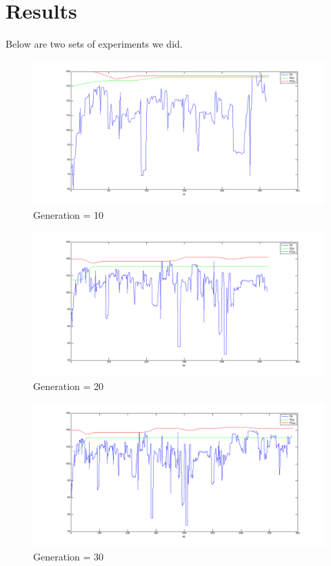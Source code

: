 \documentclass{article} %
\begin{document}
\section{Results}
Below are two sets of experiments we did.
\begin{figure}[H]
\centering
\includegraphics[scale=0.3]{images/FTGA/exp1/10.png}
\caption{Generation = 10}
\end{figure}
\begin{figure}[H]
\centering
\includegraphics[scale=0.3]{images/FTGA/exp1/20.png}
\caption{Generation = 20}
\end{figure}
\begin{figure}[H]
\centering
\includegraphics[scale=0.3]{images/FTGA/exp1/30.png}
\caption{Generation = 30}
\end{figure}
\end{document}
